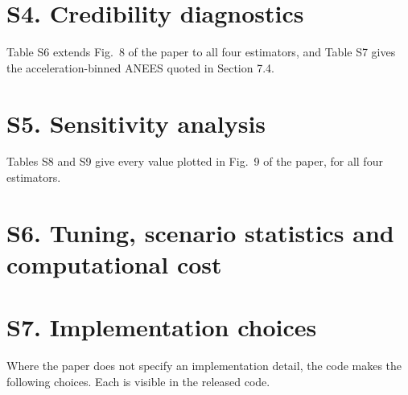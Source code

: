 \documentclass[11pt,a4paper]{article}
\begin{document}
\FloatBarrier
\section*{S4. Credibility diagnostics}

Table S6 extends Fig.~8 of the paper to all four estimators, and Table S7 gives the acceleration-binned ANEES quoted in Section 7.4.




\FloatBarrier
\section*{S5. Sensitivity analysis}

Tables S8 and S9 give every value plotted in Fig.~9 of the paper, for all four estimators.




\FloatBarrier
\section*{S6. Tuning, scenario statistics and computational cost}





\FloatBarrier
\clearpage
\section*{S7. Implementation choices}

Where the paper does not specify an implementation detail, the code makes the following choices. Each is visible in the released code.
\end{document}
